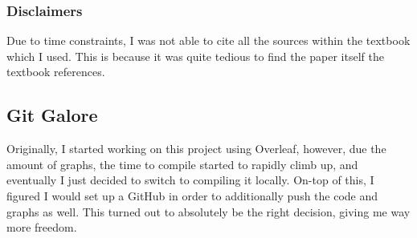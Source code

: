\documentclass[12pt, a4paper]{article}
\begin{document}
    \subsubsection{Disclaimers}
        Due to time constraints, I was not able to cite all the sources within the textbook \cite{TaurisvandenHeuvel+2023} which I used. This is because it was quite tedious to find the paper itself the textbook references. 

    \subsection{Git Galore}
    Originally, I started working on this project using Overleaf, however, due the amount of graphs, the time to compile started to rapidly climb up, and eventually I just decided to switch to compiling it locally. On-top of this, I figured I would set up a GitHub in order to additionally push the code and graphs as well. This turned out to absolutely be the right decision, giving me way more freedom.
    
\printbibliography[
heading=bibintoc,
title={\centering Sources}
]
\end{document}
